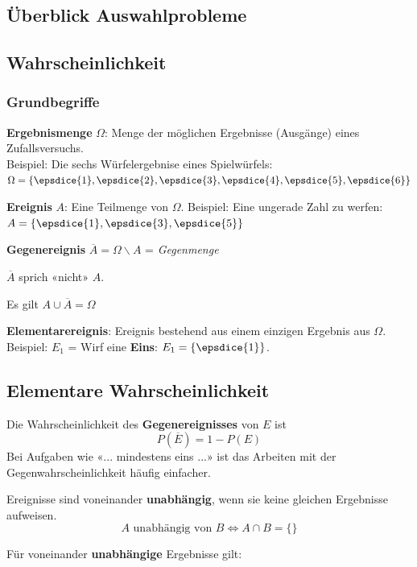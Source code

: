 \subsection*{Überblick Auswahlprobleme}
\hrulefill



\begin{multicols}{2}


\subsection*{Wahrscheinlichkeit}
\subsubsection*{Grundbegriffe}

\textbf{Ergebnismenge} $\Omega$: Menge der möglichen Ergebnisse
(Ausgänge) eines Zufallsversuchs.\\
Beispiel: Die sechs Würfelergebnise
eines Spielwürfels: $\Omega = \{\epsdice{1}, \epsdice{2}, \epsdice{3}, \epsdice{4}, \epsdice{5}, \epsdice{6}\}$

\textbf{Ereignis} $A$: Eine Teilmenge von $\Omega$. Beispiel: Eine
ungerade Zahl zu werfen: $A  = \{\epsdice{1}, \epsdice{3}, \epsdice{5}\}$

\textbf{Gegenereignis} $\overline{A} = \Omega \backslash A$ =
\textit{Gegenmenge}

$\overline{A}$ sprich «nicht» $A$.

Es gilt $A \cup \overline{A} = \Omega$

\textbf{Elementarereignis}: Ereignis bestehend aus einem einzigen
Ergebnis aus $\Omega$. Beispiel: $E_1$ = Wirf eine \textbf{Eins}: $E_1
= \{\epsdice{1}\}$.


\subsection*{Elementare Wahrscheinlichkeit}
Die Wahrscheinlichkeit des \textbf{Gegenereignisses} von $E$ ist
$$P(\overline{E}) = 1- P(E)$$
Bei Aufgaben wie «... mindestens eins ...» ist das Arbeiten mit der
Gegenwahrscheinlichkeit häufig einfacher.

Ereignisse sind voneinander \textbf{unabhängig}, wenn sie keine
gleichen Ergebnisse aufweisen.
$$A \textrm{ unabhängig von } B \Leftrightarrow A\cap B=\{\}$$

Für voneinander \textbf{unabhängige} Ergebnisse 
gilt:


\end{multicols}
